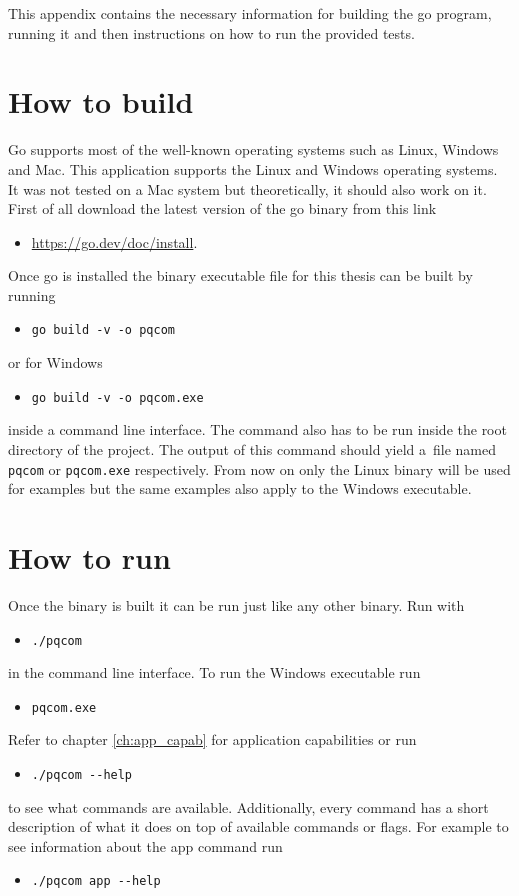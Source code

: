This appendix contains the necessary information for building the go program, running it and then instructions on how to run the provided tests.

\section{How to build}
Go supports most of the well-known operating systems such as Linux, Windows and Mac. This application supports the Linux and Windows operating systems. It was not tested on a Mac system but theoretically, it should also work on it. First of all download the latest version of the go binary from this link
\begin{itemize}
  \item \url{https://go.dev/doc/install}.
\end{itemize}
Once go is installed the binary executable file for this thesis can be built by running
\begin{itemize}
  \item \texttt{go build -v -o pqcom}
\end{itemize}
or for Windows
\begin{itemize}
  \item \texttt{go build -v -o pqcom.exe}
\end{itemize}
inside a command line interface. The command also has to be run inside the root directory of the project. The output of this command should yield a~file named \texttt{pqcom} or \texttt{pqcom.exe} respectively. From now on only the Linux binary will be used for examples but the same examples also apply to the Windows executable.
\section{How to run}
Once the binary is built it can be run just like any other binary. Run with
\begin{itemize}
  \item \texttt{./pqcom}
\end{itemize}
in the command line interface. To run the Windows executable run
\begin{itemize}
  \item \texttt{pqcom.exe}
\end{itemize}
Refer to chapter \ref{ch:app_capab} for application capabilities or run
\begin{itemize}
  \item \texttt{./pqcom -\--help}
\end{itemize}
to see what commands are available. Additionally, every command has a short description of what it does on top of available commands or flags. For example to see information about the app command run
\begin{itemize}
  \item \texttt{./pqcom app -\--help}
\end{itemize}

